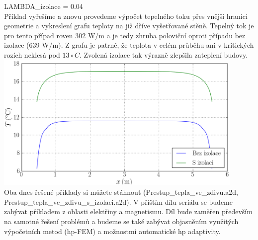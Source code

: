 \documentclass[a4paper, oneside]{article}
\begin{document}
LAMBDA\_izolace = 0.04\\
Příklad vyřešíme a znovu provedeme výpočet tepelného toku přes vnější hranici geometrie a vykreslení grafu teploty na již dříve vyšetřované stěně. Tepelný tok je pro tento případ roven 302 W/m a je tedy zhruba poloviční oproti případu bez izolace (639 W/m). Z grafu je patrné, že teplota v celém průběhu ani v kritických rozích neklesá pod $13\circ C$. Zvolená izolace tak výrazně zlepšila zateplení budovy.\\
\includegraphics[width=12cm]{Graf.eps}\\
Oba dnes řešené příklady si můžete stáhnout (Prestup\_tepla\_ve\_zdivu.a2d,\\ Prestup\_tepla\_ve\_zdivu\_s\_izolaci.a2d). V příštím dílu seriálu se budeme zabývat příkladem z oblasti elektřiny a magnetismu. Díl bude zaměřen především na samotné řešení problémů a budeme se také zabývat objasněním využitých výpočetních metod (hp-FEM) a možnostmi automatické hp adaptivity.
\end{document}

